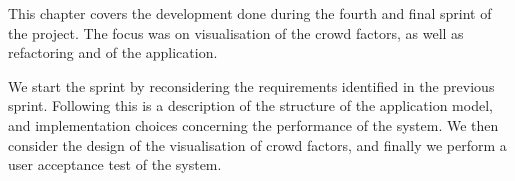 This chapter covers the development done during the fourth and final sprint of the project. The focus was on visualisation of the crowd factors, as well as refactoring and of the application.

We start the sprint by reconsidering the requirements identified in the previous sprint. Following this is a description of the structure of the application model, and implementation choices concerning the performance of the system. We then consider the design of the visualisation of crowd factors, and finally we perform a user acceptance test of the system.